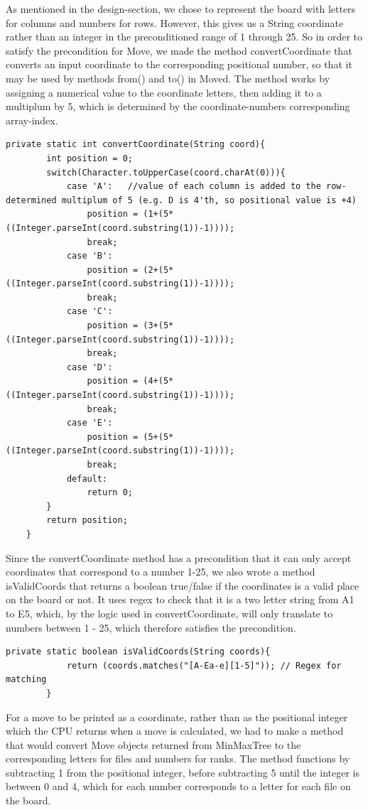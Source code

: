 \documentclass[12pt, a4paper]{article}
\begin{document}
	As mentioned in the design-section, we chose to represent the board with letters for columns and numbers for rows. However, this gives us a String coordinate rather than an integer in the preconditioned range of 1 through 25. So in order to satisfy the precondition for Move, we made the method convertCoordinate that converts an input coordinate to the corresponding positional number, so that it may be used by methods from() and to() in Moved.
	The method works by assigning a numerical value to the coordinate letters, then adding it to a multiplum by 5, which is determined by the coordinate-numbers corresponding array-index.
	\\
	\begin{lstlisting}[style=JavaStyle]
	private static int convertCoordinate(String coord){
		int position = 0;
		switch(Character.toUpperCase(coord.charAt(0))){
			case 'A':   //value of each column is added to the row-determined multiplum of 5 (e.g. D is 4'th, so positional value is +4)
				position = (1+(5*((Integer.parseInt(coord.substring(1))-1))));
				break;
			case 'B':
				position = (2+(5*((Integer.parseInt(coord.substring(1))-1))));
				break;
			case 'C':
				position = (3+(5*((Integer.parseInt(coord.substring(1))-1))));
				break;
			case 'D':
				position = (4+(5*((Integer.parseInt(coord.substring(1))-1))));
				break;
			case 'E':
				position = (5+(5*((Integer.parseInt(coord.substring(1))-1))));
				break;
			default:
				return 0;
		}
		return position;
	}
	\end{lstlisting}
	
	\newpage
	Since the convertCoordinate method has a precondition that it can only accept coordinates that correspond to a number 1-25, we also wrote a method isValidCoords that returns a boolean true/false if the coordinates is a valid place on the board or not. It uses regex to check that it is a two letter string from A1 to E5, which, by the logic used in convertCoordinate, will only translate to numbers between 1 - 25, which therefore satisfies the precondition.

	\begin{lstlisting}[style=JavaStyle]
		private static boolean isValidCoords(String coords){
			return (coords.matches("[A-Ea-e][1-5]")); // Regex for matching
		}
	\end{lstlisting}
	\vspace{10mm}
	For a move to be printed as a coordinate, rather than as the positional integer which the CPU returns when a move is calculated, we had to make a method that would convert Move objects returned from MinMaxTree to the corresponding letters for files and numbers for ranks. The method functions by subtracting 1 from the positional integer, before subtracting 5 until the integer is between 0 and 4, which for each number corresponds to a letter for each file on the board.
	
\end{document}
